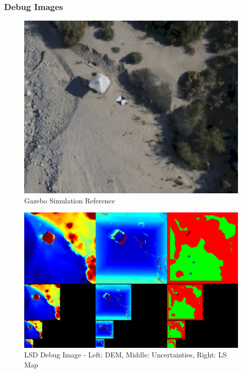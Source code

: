 \clearpage %

\subsubsection{Debug Images}

\begin{figure}[ht!]
    \centering
    \includegraphics[scale=0.25]{images/system_overview/lsd_debug_reference.png}
    \caption{Gazebo Simulation Reference}
    \label{fig:lsd_debug_ref}
\end{figure}

\begin{figure}[ht!]
    \centering
    \includegraphics[scale=0.25]{images/system_overview/lsd_debug_image.png}
    \caption{LSD Debug Image - Left: DEM, Middle: Uncertainties, Right: LS Map}
    \label{fig:lsd_debug}
\end{figure}

